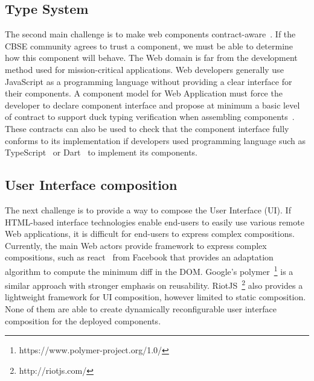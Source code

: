 
\subsection{Type System}
The second main challenge is to make web components contract-aware~\cite{beugnard1999making}. If the CBSE community agrees to trust a component, we must be able to determine how this component will behave. The Web domain is far from the development method used for  mission-critical applications. Web developers generally use JavaScript as a programming language without providing a clear interface for their components. A component model for Web Application must force the developer to declare component interface and propose at minimum a basic level of contract to support duck typing verification when assembling components~\cite{beugnard1999making}. These contracts can also be used to check that the component interface fully conforms to its implementation if developers used  programming language such as TypeScript~\cite{rastogi2015safe} or Dart~\cite{dhiman2012google} to implement its components.

\subsection{User Interface composition}  
The next challenge is to provide a way to compose the User Interface (UI). If HTML-based interface technologies enable end-users to easily use various remote Web applications, it is difficult for end-users to express complex compositions. Currently, the main Web actors provide framework to express complex compositions, such as react~\cite{fedosejev2015react} from Facebook that provides an adaptation algorithm to compute the minimum diff in the DOM. Google's polymer~\footnote{https://www.polymer-project.org/1.0/} is a similar approach with stronger emphasis on reusability. RiotJS~\footnote{http://riotjs.com/} also provides a lightweight framework for UI composition, however limited to static composition. 
None of them are able to create dynamically reconfigurable user interface composition for the deployed components.

